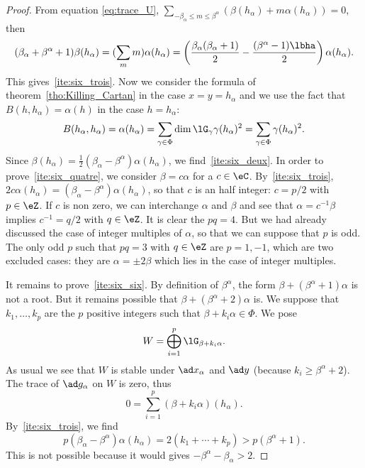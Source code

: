 \begin{proof}
From equation \eqref{eq:trace_U}, $\sum_{-\beta_{\alpha}\leq m\leq\beta^{\alpha}}( \beta(h_{\alpha})+m\alpha(h_{\alpha}) )=0$, then
\begin{equation}
(\beta_{\alpha}+\beta^{\alpha}+1)\beta(h_{\alpha})=(\sum_m m)\alpha(h_{\alpha})\\
                        =\left(
                    \frac{\beta_{\alpha}(\beta_{\alpha}+1)}{2}-\frac{(\beta^{\alpha}-1)\lbha}{2}
                        \right)\alpha(h_{\alpha}).
\end{equation}
This gives~\ref{ite:six_trois}. Now we consider the formula of theorem~\ref{tho:Killing_Cartan} in the case $x=y=h_{\alpha}$ and we use the fact that $B(h,h_{\alpha})=\alpha(h)$ in the case $h=h_{\alpha}$:
\begin{equation}
B(h_{\alpha},h_{\alpha})=\alpha(h_{\alpha})\\
            =\sum_{\gamma\in\Phi}\dim\lG_{\gamma}\gamma(h_{\alpha})^2\\
            =\sum_{\gamma\in\Phi}\gamma(h_{\alpha})^2.
\end{equation}
Since $\beta(h_{\alpha})=\frac{1}{2}(\beta_{\alpha}-\beta^{\alpha})\alpha(h_{\alpha})$, we find~\ref{ite:six_deux}. In order to prove~\ref{ite:six_quatre}, we consider $\beta=c\alpha$ for a $c\in\eC$. By~\ref{ite:six_trois}, $2c\alpha(h_{\alpha})=(\beta_{\alpha}-\beta^{\alpha})\alpha(h_{\alpha})$, so that $c$ is an half integer: $c=p/2$ with $p\in\eZ$. If $c$ is non zero, we can interchange $\alpha$ and $\beta$ and see that $\alpha=c^{-1}\beta$ implies $c^{-1}=q/2$ with $q\in\eZ$. It is clear the $pq=4$. But we had already discussed the case of integer multiples of $\alpha$, so that we can suppose that $p$ is odd. The only odd $p$ such that $pq=3$ with $q\in\eZ$ are $p=1,-1$, which are two excluded cases: they are $\alpha=\pm 2\beta$ which lies in the case of integer multiples.

It remains to prove~\ref{ite:six_six}. By definition of $\beta^{\alpha}$, the form $\beta+(\beta^{\alpha}+1)\alpha$ is not a root. But it remains possible that $\beta+(\beta^{\alpha}+2)\alpha$ is. We suppose that $k_1,\ldots,k_p$ are the $p$ positive integers such that $\beta+k_i\alpha\in\Phi$. We pose
\[
W=\bigoplus_{i=1}^p\lG_{\beta+k_i\alpha}.
\]
As usual we see that $W$ is stable under $\ad x_{\alpha}$ and $\ad y$ (because $k_i\geq\beta^{\alpha}+2$). The trace of $\ad g_{\alpha}$ on $W$ is zero, thus
\begin{equation}
0=\sum_{i=1}^p(\beta+k_i\alpha)(h_{\alpha}).
\end{equation}
By~\ref{ite:six_trois}, we find
\[
p(\beta_{\alpha}-\beta^{\alpha})\alpha(h_{\alpha})=2(k_1+\cdots+k_p)>p(\beta^{\alpha}+1).
\]
This is not possible because it would gives $-\beta^{\alpha}-\beta_{\alpha}>2$.
\end{proof}

